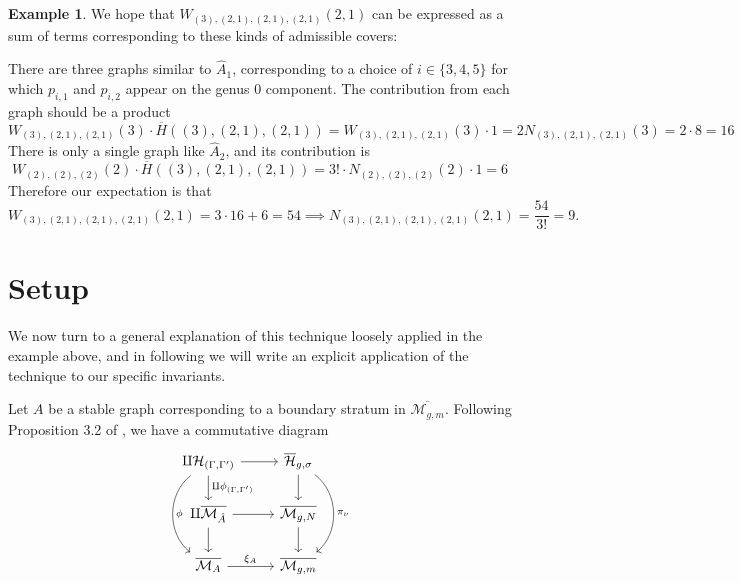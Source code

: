 \documentclass[thesis]{thesis-umich}           %
\newcommand{\Hb}{\overline{\mathcal H}}
\theoremstyle{definition}
\newtheorem{eg}[thm]{Example}
\begin{document}
\begin{eg}

                                    We hope that $W_{(3),(2,1),(2,1),(2,1)}(2,1)$ can be expressed
                                    as a sum of terms corresponding to these kinds of
                                    admissible covers:

                                    There are three graphs similar to $\hat A_1$, corresponding to a choice of $i\in\{3,4,5\}$ for which $p_{i,1}$ and $p_{i,2}$ appear on the genus $0$ component. The contribution from each graph should be a product
                                    \[
                                    W_{(3),(2,1),(2,1)}(3)\cdot \overline H((3),(2,1),(2,1))=W_{(3),(2,1),(2,1)}(3)\cdot 1=2N_{(3),(2,1),(2,1)}(3)=2\cdot 8=16
                                    \]
                                    There is only a single graph like $\hat A_2$,
                                    and its contribution is
                                    \[
                                    W_{(2),(2),(2)}(2)\cdot \overline H((3),(2,1),(2,1))=3!\cdot N_{(2),(2),(2)}(2)\cdot 1=6
                                    \]
                                    Therefore our expectation is that
                                    \[
                                    W_{(3),(2,1),(2,1),(2,1)}(2,1)=3\cdot 16+6=54\implies N_{(3),(2,1),(2,1),(2,1)}(2,1)=\frac{54}{3!}=9.
                                    \]
  \end{eg}

                \section{Setup}

                We now turn to a general explanation of this technique loosely applied in the example above, and in following \cite{Generalized} we will write an explicit application of the technique to our specific invariants.
                


Let $A$ be a stable graph
corresponding to a boundary stratum in $\overline{\mathcal M_{g,m}}$.
Following Proposition 3.2 of \cite{Lian}, we have a commutative diagram
\[\begin{tikzcd}
\amalg \mathcal H_{(\Gamma,\Gamma')} & \Hb_{g,\sigma} \\
\amalg \overline{\mathcal M_{\hat A}} & \overline{\mathcal M_{g,N}} \\
	\overline{\mathcal M_A} & \overline{\mathcal M_{g,m}}
	\arrow[from=1-1, to=1-2]
	\arrow[from=1-1, to=2-1, "\amalg \phi_{(\Gamma,\Gamma')}"]
        \arrow[from=2-1, to=3-1]
	\arrow[from=1-2, to=2-2]
	\arrow[from=2-1, to=2-2]
        \arrow[from=2-2, to=3-2]
        \arrow[from=3-1, to=3-2, "\xi_A"]
        \arrow[from=1-2, to=3-2, bend left=52, "\pi_{\nu}"]
        \arrow[from=1-1, to=3-1, bend  right=52, "\phi"]
\end{tikzcd}\]
\end{document}
